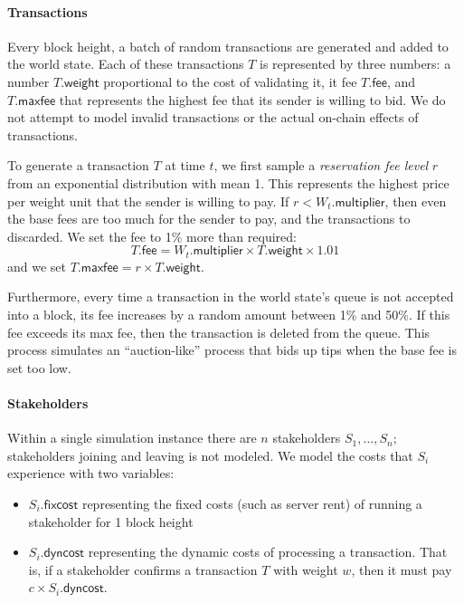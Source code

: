 \documentclass[letterpaper,12pt,oneside]{article}
\begin{document}
\paragraph*{Transactions} Every block height, a batch of random transactions are generated and added to the world state. Each of these transactions $T$ is represented by three numbers: a number $T.\mathsf{weight}$ proportional to the cost of validating it, it fee $T.\mathsf{fee}$, and $T.\mathsf{maxfee}$ that represents the highest fee that its sender is willing to bid. We do not attempt to model invalid transactions or the actual on-chain effects of transactions.

To generate a transaction $T$ at time $t$, we first sample a \emph{reservation fee level} $r$ from an exponential distribution with mean 1. This represents the highest price per weight unit that the sender is willing to pay. If $r<W_t.\mathsf{multiplier}$, then even the base fees are too much for the sender to pay, and the transactions to discarded. We set the fee to 1\% more than required:
\[ T.\mathsf{fee} = W_t.\mathsf{multiplier} \times T.\mathsf{weight} \times 1.01 \]
and we set $T.\mathsf{maxfee} = r \times T.\mathsf{weight}$.

Furthermore, every time a transaction in the world state's queue is not accepted into a block, its fee increases by a random amount between 1\% and 50\%. If this fee exceeds its max fee, then the transaction is deleted from the queue. This process simulates an ``auction-like'' process that bids up tips when the base fee is set too low.

\paragraph*{Stakeholders} Within a single simulation instance there are $n$ stakeholders $S_1,\dots,S_n$; stakeholders joining and leaving is not modeled. We model the costs that $S_i$ experience with two variables:
\begin{itemize}
    \item $S_i.\mathsf{fixcost}$ representing the fixed costs (such as server rent) of running a stakeholder for 1 block height
    \item $S_i.\mathsf{dyncost}$ representing the dynamic costs of processing a transaction. That is, if a stakeholder confirms a transaction $T$ with weight $w$, then it must pay $c \times S_i.\mathsf{dyncost}$.
\end{itemize}
\end{document}

